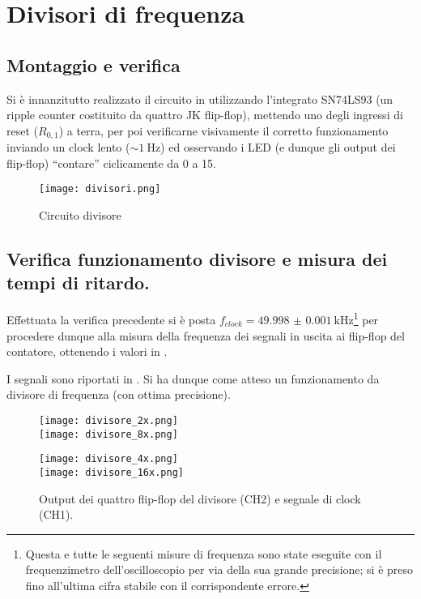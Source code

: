 \section{Divisori di frequenza}
\subsection{Montaggio e verifica}
Si è innanzitutto realizzato il circuito in  utilizzando l'integrato SN74LS93 (un ripple counter costituito da quattro JK flip-flop), mettendo uno degli ingressi di reset ($R_{0,1}$) a terra, per poi verificarne visivamente il corretto funzionamento inviando un clock lento ($\sim \SI{1}{\Hz}$) ed osservando i LED (e dunque gli output dei flip-flop) ``contare'' ciclicamente da 0 a 15.

\begin{figure}[h]
	\centering
	\texttt{[image: divisori.png]}
	\caption{Circuito divisore}
	\label{fig:div}
\end{figure}

\subsection{Verifica funzionamento divisore e misura dei tempi di ritardo.}
Effettuata la verifica precedente si è posta $f_{clock} = \SI{49.998(1)}{ \kilo \hertz}$\footnote{Questa e tutte le seguenti misure di frequenza sono state eseguite con il frequenzimetro dell'oscilloscopio per via della sua grande precisione; si è preso fino all'ultima cifra stabile con il corrispondente errore.} per procedere dunque alla misura della frequenza dei segnali in uscita ai flip-flop del contatore, ottenendo i valori in .

I segnali sono riportati in . Si ha dunque come atteso un funzionamento da divisore di frequenza (con ottima precisione).

\begin{figure}[h]
	\centering
	\begin{minipage}{0.47\textwidth}
		\texttt{[image: divisore\_2x.png]}
		\\
		\texttt{[image: divisore\_8x.png]}
	\end{minipage}
	\begin{minipage}{0.47\textwidth}
		\texttt{[image: divisore\_4x.png]}
		\\
		\texttt{[image: divisore\_16x.png]}
	\end{minipage}
	\caption{Output dei quattro flip-flop del divisore (CH2) e segnale di clock (CH1).}
	\label{fig:divout}
\end{figure}

